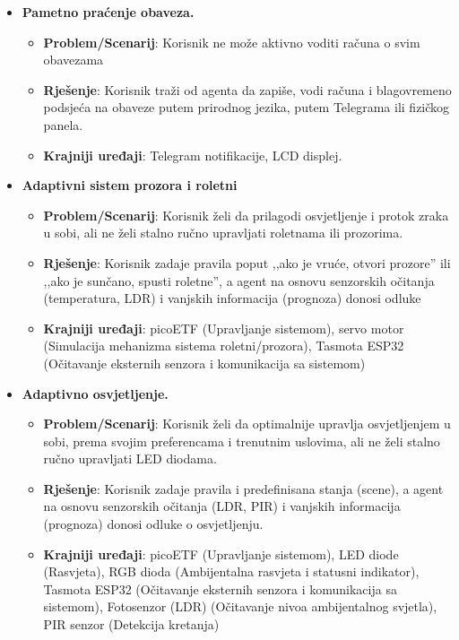 \documentclass[11pt,a4paper]{article}
\begin{document}
\begin{itemize}[nosep]
      \item \textbf{Pametno praćenje obaveza.}
            \begin{itemize}
                  \item \textbf{Problem/Scenarij}: Korisnik ne može aktivno voditi računa o svim obavezama
                  \item \textbf{Rješenje}: Korisnik traži od agenta da zapiše, vodi računa i blagovremeno podsjeća na obaveze putem prirodnog jezika, putem Telegrama ili fizičkog panela.
                  \item \textbf{Krajniji uređaji}: Telegram notifikacije, LCD displej.

            \end{itemize}
      \item \textbf{Adaptivni sistem prozora i roletni}
            \begin{itemize}
                  \item \textbf{Problem/Scenarij}: Korisnik želi da prilagodi osvjetljenje i protok zraka u sobi, ali ne želi stalno ručno upravljati roletnama ili prozorima.
                  \item \textbf{Rješenje}: Korisnik zadaje pravila poput ,,ako je vruće, otvori prozore'' ili ,,ako je sunčano, spusti roletne'', a agent na osnovu senzorskih očitanja (temperatura, LDR) i vanjskih informacija (prognoza) donosi odluke
                  \item \textbf{Krajniji uređaji}: picoETF (Upravljanje sistemom), servo motor (Simulacija mehanizma sistema roletni/prozora), Tasmota ESP32 (Očitavanje eksternih senzora i komunikacija sa sistemom)
            \end{itemize}
      \item \textbf{Adaptivno osvjetljenje.}
            \begin{itemize}
                  \item \textbf{Problem/Scenarij}: Korisnik želi da optimalnije upravlja osvjetljenjem u sobi, prema svojim preferencama i trenutnim uslovima, ali ne želi stalno ručno upravljati LED diodama.
                  \item \textbf{Rješenje}: Korisnik zadaje pravila i predefinisana stanja (scene), a agent na osnovu senzorskih očitanja (LDR, PIR) i vanjskih informacija (prognoza) donosi odluke o osvjetljenju.
                  \item \textbf{Krajniji uređaji}: picoETF (Upravljanje sistemom), LED diode (Rasvjeta), RGB dioda (Ambijentalna rasvjeta i statusni indikator), Tasmota ESP32 (Očitavanje eksternih senzora i komunikacija sa sistemom), Fotosenzor (LDR) (Očitavanje nivoa ambijentalnog svjetla), PIR senzor (Detekcija kretanja)

\end{itemize}
\end{itemize}
\end{document}
